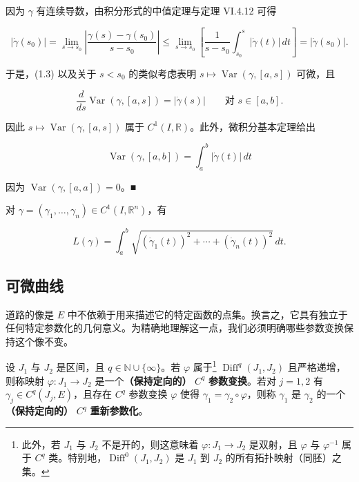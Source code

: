 \begin{theorem}
\begin{subitems}
因为 $ \gamma $ 有连续导数，由积分形式的中值定理与定理 VI.4.12 可得

\[
|\dot{\gamma}(s_0)| = \lim_{s \to s_0}\left|\frac{\gamma(s) - \gamma(s_0)}{s - s_0}\right| \le \lim_{s \to s_0}\left[\frac{1}{s - s_0}\int_{s_0}^{s}|\dot{\gamma}(t)|\,dt\right] = |\dot{\gamma}(s_0)| .
\]

于是，(1.3) 以及关于 $ s < s_0 $ 的类似考虑表明 $ s \mapsto \operatorname{Var}(\gamma,[a,s]) $ 可微，且

\[
\frac{d}{ds}\operatorname{Var}(\gamma,[a,s]) = |\dot{\gamma}(s)| \qquad \text{对 } s \in [a,b] .
\]

因此 $ s \mapsto \operatorname{Var}(\gamma,[a,s]) $ 属于 $ C^{1}(I,\mathbb{R}) $。此外，微积分基本定理给出

\[
\operatorname{Var}(\gamma,[a,b]) = \int_a^b |\dot{\gamma}(t)|\,dt
\]

因为 $ \operatorname{Var}(\gamma,[a,a]) = 0 $。\nobreak\hspace{0.35em}■

\end{subitems}

\end{theorem}

\begin{corollary}

对 $ \gamma = (\gamma_1,\ldots,\gamma_n) \in C^{1}(I,\mathbb{R}^n) $，有

\[
L(\gamma) = \int_a^b\sqrt{\left(\dot{\gamma}_1(t)\right)^{2} + \cdots + \left(\dot{\gamma}_n(t)\right)^{2}}\,dt .
\]
\end{corollary}

\subsection*{可微曲线}

道路的像是 $ E $ 中不依赖于用来描述它的特定函数的点集。换言之，它具有独立于任何特定参数化的几何意义。为精确地理解这一点，我们必须明确哪些参数变换保持这个像不变。

设 $ J_1 $ 与 $ J_2 $ 是区间，且 $ q \in \mathbb{N} \cup \{\infty\} $。若 $ \varphi $ 属于\footnote{此外，若 $ J_1 $ 与 $ J_2 $ 不是开的，则这意味着 $ \varphi : J_1 \to J_2 $ 是双射，且 $ \varphi $ 与 $ \varphi^{-1} $ 属于 $ C^{q} $ 类。特别地，$ \operatorname{Diff}^{0}(J_1,J_2) $ 是 $ J_1 $ 到 $ J_2 $ 的所有拓扑映射（同胚）之集。} $ \operatorname{Diff}^{q}(J_1,J_2) $ 且严格递增，则称映射 $ \varphi : J_1 \to J_2 $ 是一个\textbf{（保持定向的）} $ C^{q} $ \textbf{参数变换}。若对 $ j = 1,2 $ 有 $ \gamma_j \in C^{q}(J_j,E) $，且存在 $ C^{q} $ 参数变换 $ \varphi $ 使得 $ \gamma_1 = \gamma_2 \circ \varphi $，则称 $ \gamma_1 $ 是 $ \gamma_2 $ 的一个\textbf{（保持定向的）} $ C^{q} $ \textbf{重新参数化}。

